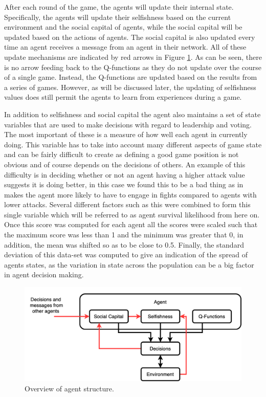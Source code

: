 After each round of the game, the agents will update their internal state. Specifically, the agents will update their selfishness based on the current environment and the social capital of agents, while the social capital will be updated based on the actions of agents. The social capital is also updated every time an agent receives a message from an agent in their network. All of these update mechanisms are indicated by red arrows in Figure \ref{fig:agent_structure}. As can be seen, there is no arrow feeding back to the Q-functions as they do not update over the course of a single game. Instead, the Q-functions are updated based on the results from a series of games. However, as will be discussed later, the updating of selfishness values does still permit the agents to learn from experiences during a game.

In addition to selfishness and social capital the agent also maintains a set of state variables that are used to make decisions with regard to leadership and voting. The most important of these is a measure of how well each agent in currently doing. This variable has to take into account many different aspects of game state and can be fairly difficult to create as defining a good game position is not obvious and of course depends on the decisions of others. An example of this difficulty is in deciding whether or not an agent having a higher attack value suggests it is doing better, in this case we found this to be a bad thing as in makes the agent more likely to have to engage in fights compared to agents with lower attacks. Several different factors such as this were combined to form this single variable which will be referred to as agent survival likelihood from here on. Once this score was computed for each agent all the scores were scaled such that the maximum score was less than 1 and the minimum was greater that 0, in addition, the mean was shifted so as to be close to 0.5. Finally, the standard deviation of this data-set was computed to give an indication of the spread of agents states, as the variation in state across the population can be a big factor in agent decision making. 

\begin{figure}[!h]
    \centering
    \includegraphics[width=0.75\linewidth]{004_team_1_agent_design/images/agent_structure.png}
    \caption{Overview of agent structure.}
    \label{fig:agent_structure}
\end{figure}

